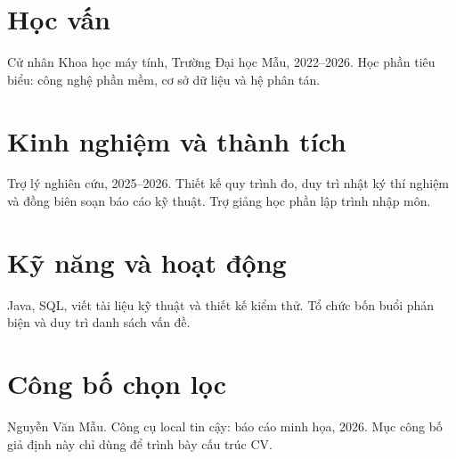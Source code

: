\section{Học vấn}
Cử nhân Khoa học máy tính, Trường Đại học Mẫu, 2022--2026. Học phần tiêu biểu: công nghệ phần mềm, cơ sở dữ liệu và hệ phân tán.

\section{Kinh nghiệm và thành tích}
Trợ lý nghiên cứu, 2025--2026. Thiết kế quy trình đo, duy trì nhật ký thí nghiệm và đồng biên soạn báo cáo kỹ thuật. Trợ giảng học phần lập trình nhập môn.

\section{Kỹ năng và hoạt động}
Java, SQL, viết tài liệu kỹ thuật và thiết kế kiểm thử. Tổ chức bốn buổi phản biện và duy trì danh sách vấn đề.

\section{Công bố chọn lọc}
Nguyễn Văn Mẫu. Công cụ local tin cậy: báo cáo minh họa, 2026. Mục công bố giả định này chỉ dùng để trình bày cấu trúc CV.

